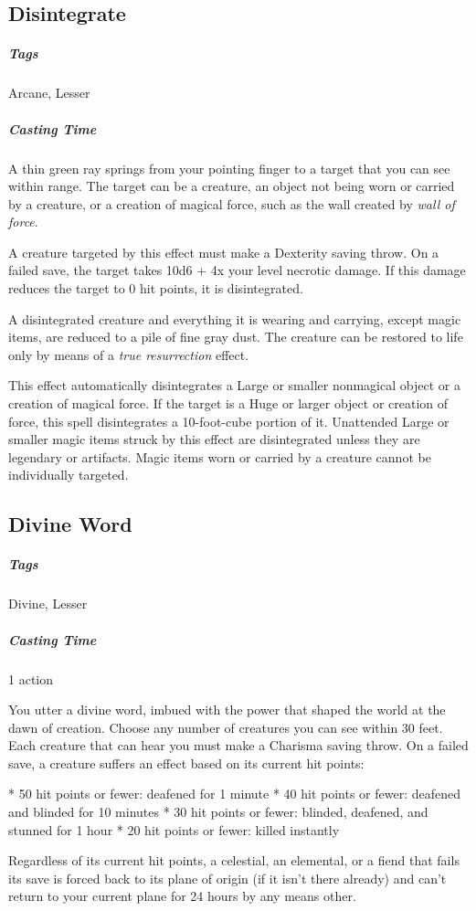 \subsection{Disintegrate}\label{spell:disintegrate}
\subparagraph*{Tags} Arcane, Lesser
\subparagraph*{Casting Time}

A thin green ray springs from your pointing finger to a target that you can see within range. The target can be a creature, an object not being worn or carried by a creature, or a creation of magical force, such as the wall created by \textit{wall of force}.

A creature targeted by this effect must make a Dexterity saving throw. On a failed save, the target takes 10d6 + 4x your level necrotic damage. If this damage reduces the target to 0 hit points, it is disintegrated.

A disintegrated creature and everything it is wearing and carrying, except magic items, are reduced to a pile of fine gray dust. The creature can be restored to life only by means of a \textit{true resurrection} effect.

This effect automatically disintegrates a Large or smaller nonmagical object or a creation of magical force. If the target is a Huge or larger object or creation of force, this spell disintegrates a 10-foot-cube portion of it. Unattended Large or smaller magic items struck by this effect are disintegrated unless they are legendary or artifacts. Magic items worn or carried by a creature cannot be individually targeted.

\subsection{Divine Word}\label{spell:divine-word}
\subparagraph*{Tags} Divine, Lesser
\subparagraph*{Casting Time} 1 action

You utter a divine word, imbued with the power that shaped the world at the dawn of creation. Choose any number of creatures you can see within 30 feet. Each creature that can hear you must make a Charisma saving throw. On a failed save, a creature suffers an effect based on its current hit points:

* 50 hit points or fewer: deafened for 1 minute
* 40 hit points or fewer: deafened and blinded for 10 minutes
* 30 hit points or fewer: blinded, deafened, and stunned for 1 hour
* 20 hit points or fewer: killed instantly 

Regardless of its current hit points, a celestial, an elemental, or a fiend that fails its save is forced back to its plane of origin (if it isn't there already) and can't return to your current plane for 24 hours by any means other.


